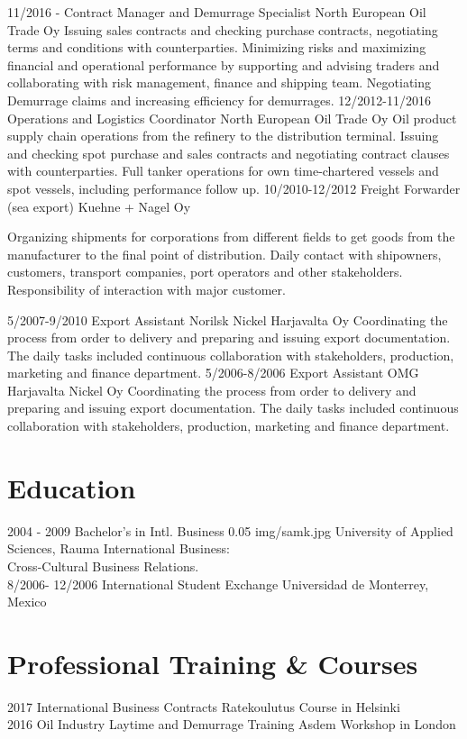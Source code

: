 \documentclass[]{friggeri-cv}
\begin{document}
\begin{entrylist}
 
\entry
{11/2016 - }
{Contract Manager and Demurrage Specialist}
{North European Oil Trade Oy}
{Issuing sales contracts and checking purchase contracts, negotiating terms
and conditions with counterparties. Minimizing risks and maximizing financial and operational
performance by supporting and advising traders and collaborating with risk management, finance and
shipping team. Negotiating Demurrage claims and increasing efficiency for demurrages.
}
\entry
{12/2012-11/2016}
{Operations and Logistics Coordinator}
{North European Oil Trade Oy}
{Oil product supply chain operations from the refinery to the distribution terminal. Issuing and checking
spot purchase and sales contracts and negotiating contract clauses with counterparties. Full tanker
operations for own time-chartered vessels and spot vessels, including performance follow up.
}
\entry
{10/2010-12/2012}
{Freight Forwarder (sea export)} 
{Kuehne + Nagel Oy}
{Organizing shipments for corporations from different fields to get goods from the manufacturer to the final
point of distribution. Daily contact with shipowners, customers, transport companies, port operators and
other stakeholders. Responsibility of interaction with major customer.

}
\entry
{5/2007-9/2010}
{Export Assistant}
{Norilsk Nickel Harjavalta Oy}
{Coordinating the process from order to delivery and preparing and issuing export documentation. The daily tasks
included continuous collaboration with stakeholders, production, marketing and finance department.}
\entry
{5/2006-8/2006}
{Export Assistant}
{OMG Harjavalta Nickel Oy}
{Coordinating the process from order to delivery and preparing and issuing export documentation. The daily tasks
included continuous collaboration with stakeholders, production, marketing and finance department.}
\end{entrylist}

\section{Education}
\begin{entrylist}
\unientry
{2004 - 2009}
{Bachelor's in Intl. Business}
{0.05}
{img/samk.jpg}
{University of Applied Sciences, Rauma}
{International Business:\\
Cross-Cultural Business Relations.
}
\\
\entry
    {8/2006- 12/2006}
    {International Student Exchange}
    {Universidad de Monterrey, Mexico}
    {}
\\
\end{entrylist}
\section{Professional Training \& Courses}
\begin{entrylist}
\entry
{2017}
{International Business Contracts}
{Ratekoulutus}
{Course in Helsinki}
\\
\entry
{2016}
{Oil Industry Laytime and Demurrage Training}
{Asdem}
{Workshop in London }
\\
\end{entrylist}
 
\end{document}
